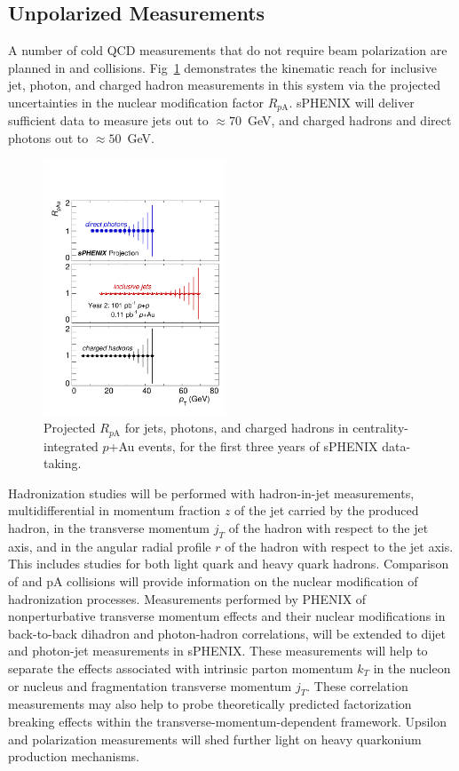 \subsection {Unpolarized Measurements}

A number of cold QCD measurements that do not require beam
polarization are planned in \pp and \pA collisions. Fig~\ref{fig:jet_RpA_proj} demonstrates the kinematic reach for inclusive jet, photon, and charged hadron measurements in this system via the projected uncertainties in the nuclear modification factor $R_{p\mathrm{A}}$. sPHENIX will deliver sufficient data to measure jets out to $\approx 70$~GeV, and charged hadrons and direct photons out to $\approx 50$~GeV.

\begin{figure}[t]
\centering
\includegraphics[width=0.48\textwidth]{figs/RpA.pdf}
\caption{Projected $R_{p\mathrm{A}}$ for jets, photons, and charged hadrons in centrality-integrated $p$+Au events, for the first three years of sPHENIX data-taking.}
\label{fig:jet_RpA_proj}
\end{figure}

Hadronization
studies will be performed with hadron-in-jet measurements,
multidifferential in momentum fraction $z$ of the jet carried by the
produced hadron, in the transverse momentum $j_T$ of the hadron with
respect to the jet axis, and in the angular radial profile $r$ of the
hadron with respect to the jet axis. This includes studies for both
light quark and heavy quark hadrons. Comparison of \pp and pA
collisions will provide information on the nuclear modification of
hadronization processes. Measurements performed by PHENIX of
nonperturbative transverse momentum effects and their nuclear
modifications in back-to-back dihadron and photon-hadron correlations,
will be extended to dijet and photon-jet measurements in sPHENIX.
These measurements will help to separate the effects associated with
intrinsic parton momentum $k_T$ in the nucleon or nucleus and
fragmentation transverse momentum $j_T$. These correlation
measurements may also help to probe theoretically predicted
factorization breaking effects within the
transverse-momentum-dependent framework. Upsilon and \jpsi
polarization measurements will shed further light on heavy quarkonium
production mechanisms. 
